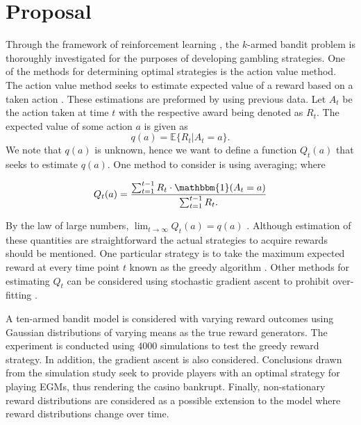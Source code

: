 \documentclass[12pt, centerh1]{article}
\begin{document}
\section{Proposal}
Through the framework of reinforcement learning \citep{sutton2018reinforcement}, the $k$-armed bandit problem is thoroughly investigated for the purposes of developing gambling strategies. One of the methods for determining optimal strategies is the action value method. The action value method seeks to estimate expected value of a reward based on a taken action \citep{koulouriotis2008reinforcement}. These estimations are preformed by using previous data. Let $A_t$ be the action taken at time $t$ with the respective award being denoted as $R_t$. The expected value of some action $a$ is given as 
$$q(a) = \mathbb{E} \{R_t | A_t = a  \}.$$
We note that $q(a)$ is unknown, hence we want to define a function $Q_t(a)$ that seeks to estimate $q(a)$. One method to consider is using averaging; where

$$ Q_t(a)= \frac{\sum_{t=1}^{t-1} R_t \cdot \mathbbm{1}(A_t = a)}{ \sum_{t=1}^{t-1}R_t.}$$

By the law of large numbers, $\lim_{t \to \infty} Q_t(a) = q(a) $ \citep{hsu1947complete}. Although estimation of these quantities are straightforward the actual strategies to acquire rewards should be mentioned. One particular strategy is to take the maximum expected reward at every time point $t$ known as the greedy algorithm \citep{komiyama2013multi}. Other methods for estimating $Q_t$ can be considered using stochastic gradient ascent to prohibit over-fitting \citep{yuan2019marrying}. 

A ten-armed bandit model is considered with varying reward outcomes using Gaussian distributions of varying means as the true reward generators. The experiment is conducted using $4000$ simulations to test the greedy reward strategy. In addition, the gradient ascent is also considered. Conclusions drawn from the simulation study seek to provide players with an optimal strategy for playing EGMs, thus rendering the casino bankrupt. Finally, non-stationary reward distributions are considered as a possible extension to the model where reward distributions change over time.

\newpage


\end{document}
